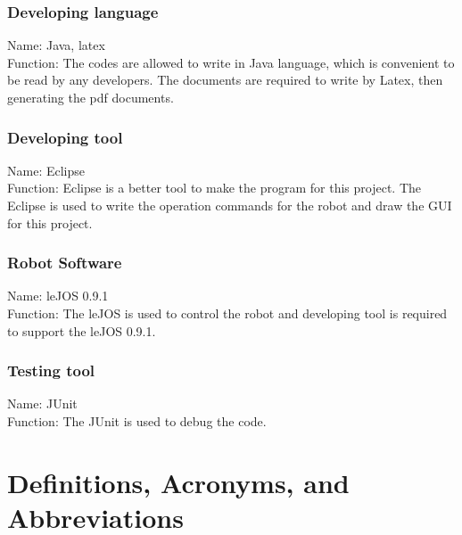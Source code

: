 \documentclass[11pt, a4paper]{report}
\begin{document}
\subsection{Developing language}
Name: Java, latex\\
Function: The codes are allowed to write in Java language, which is convenient to be read by any developers. The documents are required to write by Latex, then generating the pdf documents.
\subsection{Developing tool}
Name: Eclipse\\
Function: Eclipse is a better tool to make the program for this project. The Eclipse is used to write the operation commands for the robot and draw the GUI for this project.
\subsection{Robot Software}
Name: leJOS 0.9.1\\
 Function: The leJOS is used to control the robot and developing tool is required to support the leJOS 0.9.1.
 \subsection{Testing tool}
 Name: JUnit\\
 Function: The JUnit is used to debug the code.

\pagebreak

\chapter{Definitions, Acronyms, and Abbreviations} %
\label{cha:DAA}
\end{document}
